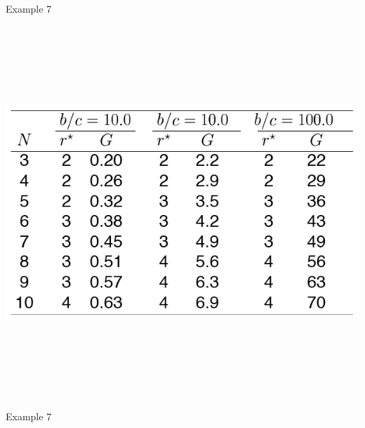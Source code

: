 \documentclass[12pt]{article}
\newcommand{\headsize}{\fontsize{35}{35} \selectfont}
\begin{document}
\newpage


\headsize \color{myyellow}
\hfill \begin{minipage}{5.75in}
\centering
Example 7
\end{minipage}

\vspace{30mm}

\centerline{\includegraphics[height=5.5in]{Figs/tableA.png}}


\newpage


\headsize \color{myyellow}
\hfill \begin{minipage}{5.75in}
\centering
Example 7
\end{minipage}

\vspace{30mm}
\end{document}
